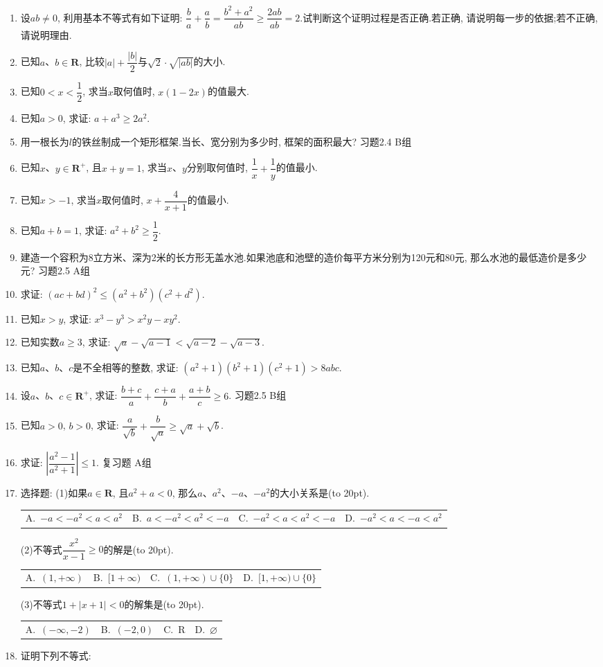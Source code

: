 \documentclass[10pt,a4paper]{article}
\newcommand{\bracket}[1]{(\hbox to #1pt{})}
\newcommand{\fourch}[4]{\par\begin{tabular}{p{.23\textwidth}p{.23\textwidth}p{.23\textwidth}p{.23\textwidth}}
A.~#1 &B.~#2& C.~#3& D.~#4
\end{tabular}}
\begin{document}
\begin{enumerate}[1.]
\fourch{$a^2+b^2>2ab$}{$a+b\ge 2\sqrt {ab}$}{$\dfrac 1a+\dfrac 1b>\dfrac 2{\sqrt {ab}}$}{$\dfrac ba+\dfrac ab\ge 2$}
\item 设$ab\ne 0$, 利用基本不等式有如下证明: $\dfrac ba+\dfrac ab=\dfrac{{b^2}+{a^2}}{ab}\ge \dfrac{2ab}{ab}=2$.试判断这个证明过程是否正确.若正确, 请说明每一步的依据;若不正确, 请说明理由.
\item 已知$a$、$b\in \mathbf{R}$, 比较$|a|+\dfrac{|b|}2$与$\sqrt 2\cdot \sqrt {|ab|}$的大小.
\item 已知$0<x<\dfrac 12$, 求当$x$取何值时, $x(1-2x)$的值最大.
\item 已知$a>0$, 求证: $a+a^3\ge 2a^2$.
\item 用一根长为$l$的铁丝制成一个矩形框架.当长、宽分别为多少时, 框架的面积最大?
习题2.4  B组
\item 已知$x$、$y\in \mathbf{R}^+$, 且$x+y=1$, 求当$x$、$y$分别取何值时, $\dfrac 1x+\dfrac 1y$的值最小.
\item 已知$x>-1$, 求当$x$取何值时, $x+\dfrac 4{x+1}$的值最小.
\item 已知$a+b=1$, 求证: $a^2+b^2\ge \dfrac 12$.
\item 建造一个容积为8立方米、深为2米的长方形无盖水池.如果池底和池壁的造价每平方米分别为120元和80元, 那么水池的最低造价是多少元?
习题2.5  A组
\item 求证: $(ac+bd)^2\le (a^2+b^2)(c^2+d^2)$.
\item 已知$x>y$, 求证: $x^3-y^3>x^2y-xy^2$.
\item 已知实数$a\ge 3$, 求证: $\sqrt a-\sqrt {a-1}<\sqrt {a-2}-\sqrt {a-3}$.
\item 已知$a$、$b$、$c$是不全相等的整数, 求证: $(a^2+1)(b^2+1)(c^2+1)>8abc$.
\item 设$a$、$b$、$c\in \mathbf{R}^+$, 求证: $\dfrac{b+c}a+\dfrac{c+a}b+\dfrac{a+b}c\ge 6$.
习题2.5  B组
\item 已知$a>0$, $b>0$, 求证: $\dfrac a{\sqrt b}+\dfrac b{\sqrt a}\ge \sqrt a+\sqrt b$.
\item 求证: $|\dfrac{{a^2}-1}{{a^2}+1}|\le 1$.
复习题
A组
\item 选择题:
(1)如果$a\in \mathbf{R}$, 且$a^2+a<0$, 那么$a$、$a^2$、$-a$、$-a^2$的大小关系是\bracket{20}.
\fourch{$-a<-a^2<a<a^2$}{$a<-a^2<a^2<-a$}{$-a^2<a<a^2<-a$}{$-a^2<a<-a<a^2$}
(2)不等式$\dfrac{x^2}{x-1}\ge 0$的解是\bracket{20}.
\fourch{$(1,+\infty)$}{$[1+\infty)$}{$(1,+\infty)\cup \{0\}$}{$[1,+\infty)\cup \{0\}$}
(3)不等式$1+|x+1|<0$的解集是\bracket{20}.
\fourch{$(-\infty ,-2)$}{$(-2,0)$}{R}{$\varnothing$}
\item 证明下列不等式:

\end{enumerate}
\end{document}
